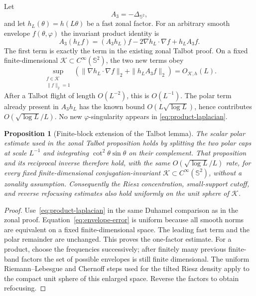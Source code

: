 \documentclass[11pt]{article}
\newtheorem{proposition}[theorem]{Proposition}
\theoremstyle{remark}
\begin{document}
Let
\[
 A_3=-\Delta_{\mathbb S^2},
\]
and let $h_L(\theta)=h(L\theta)$ be a fast zonal factor.  For an arbitrary
smooth envelope $f(\theta,\varphi)$ the invariant product identity is
\begin{equation}
 A_3(h_Lf)=(A_3h_L)f-2\nabla h_L\cdot\nabla f+h_LA_3f.
 \label{eq:product-laplacian}
\end{equation}
The first term is exactly the term in the existing zonal Talbot proof.  On a
fixed finite-dimensional $\mathcal K\subset C^\infty(\mathbb S^2)$, the two
new terms obey
\begin{equation}
 \sup_{\substack{f\in\mathcal K\\\|f\|_2=1}}
 \left(
  \|\nabla h_L\cdot\nabla f\|_2+\|h_LA_3f\|_2
 \right)=O_{\mathcal K,h}(L).
 \label{eq:envelope-error}
\end{equation}
After a Talbot flight of length $O(L^{-2})$, this is $O(L^{-1})$.  The polar
term already present in $A_3h_L$ has the known bound
$O(L\sqrt{\log L})$, hence contributes
$O(\sqrt{\log L}/L)$.  No new $\varphi$-singularity appears in
\eqref{eq:product-laplacian}.

\begin{proposition}[Finite-block extension of the Talbot lemma]
\label{prop:full-block-talbot}
The scalar polar estimate used in the zonal Talbot proposition holds by
splitting the two polar caps at scale $L^{-1}$ and integrating
$\cot^2\theta\sin\theta$ on their complement.  That proposition and its
reciprocal inverse therefore hold, with
the same $O(\sqrt{\log L}/L)$ rate, for every fixed finite-dimensional
conjugation-invariant
$\mathcal K\subset C^\infty(\mathbb S^2)$, without a zonality assumption.
Consequently the Riesz concentration, small-support cutoff, and reverse
refocusing estimates also hold uniformly on the unit sphere of
$\mathcal K$.
\end{proposition}

\begin{proof}
Use~\eqref{eq:product-laplacian} in the same Duhamel comparison as in the
zonal proof.  Equation~\eqref{eq:envelope-error} is uniform because all
smooth norms are equivalent on a fixed finite-dimensional space.  The
leading fast term and the polar remainder are unchanged.  This proves the
one-factor estimate.  For a product, choose the frequencies successively;
after finitely many previous finite-band factors the set of possible
envelopes is still finite dimensional.  The uniform Riemann--Lebesgue and
Chernoff steps used for the tilted Riesz density apply to the compact unit
sphere of this enlarged space.  Reverse the factors to obtain refocusing.
\end{proof}
\end{document}
